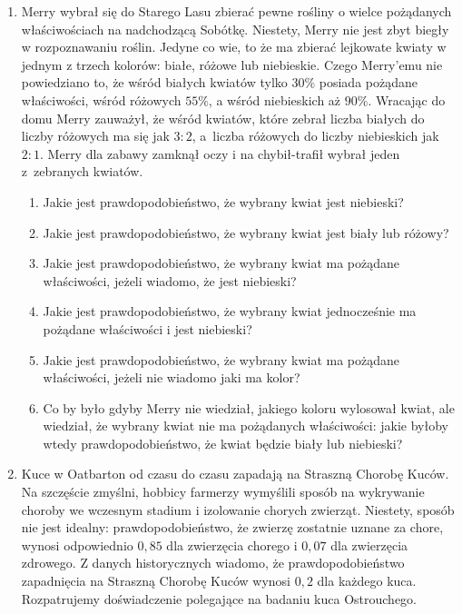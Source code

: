 \documentclass{mwart}
\begin{document}
\begin{enumerate}
\item Merry wybrał się do Starego Lasu zbierać pewne rośliny o wielce pożądanych właściwościach na nadchodzącą Sobótkę.
Niestety, Merry nie jest zbyt biegły w rozpoznawaniu roślin.
Jedyne co wie, to że ma zbierać lejkowate kwiaty w jednym z trzech kolorów: białe, różowe lub niebieskie.
Czego Merry'emu nie powiedziano to, że wśród białych kwiatów tylko $30\%$ posiada pożądane właściwości, wśród różowych $55\%$, a wśród niebieskich
aż $90\%$.
Wracając do domu Merry zauważył, że wśród kwiatów, które zebrał liczba białych do liczby różowych ma się jak $3:2$, a~liczba różowych do
liczby niebieskich jak $2:1$. Merry dla zabawy zamknął oczy i na chybił-trafił wybrał jeden z~zebranych kwiatów.
 
\begin{enumerate}
	\item Jakie jest prawdopodobieństwo, że wybrany kwiat jest niebieski?
	\item Jakie jest prawdopodobieństwo, że wybrany kwiat jest biały lub różowy?
	\item Jakie jest prawdopodobieństwo, że wybrany kwiat ma pożądane właściwości, jeżeli wiadomo, że jest niebieski?
	\item Jakie jest prawdopodobieństwo, że wybrany kwiat jednocześnie ma pożądane właściwości i jest niebieski?
	\item Jakie jest prawdopodobieństwo, że wybrany kwiat ma pożądane właściwości, jeżeli nie wiadomo jaki ma kolor?
	\item Co by było gdyby Merry nie wiedział, jakiego koloru wylosował kwiat, ale wiedział, że wybrany kwiat nie ma pożądanych
		właściwości: jakie byłoby wtedy prawdopodobieństwo, że kwiat będzie biały lub niebieski?
\end{enumerate}
\clearpage
\item Kuce w Oatbarton od czasu do czasu zapadają na Straszną Chorobę Kuców.
Na szczęście zmyślni, hobbicy farmerzy wymyślili sposób na wykrywanie choroby we wczesnym stadium i izolowanie chorych zwierząt.
Niestety, sposób nie jest idealny: prawdopodobieństwo, że zwierzę zostatnie uznane za chore, wynosi odpowiednio $0,85$ dla zwierzęcia chorego i $0,07$ dla zwierzęcia zdrowego.
Z danych historycznych wiadomo, że prawdopodobieństwo zapadnięcia na Straszną Chorobę Kuców wynosi $0,2$ dla każdego kuca.
Rozpatrujemy doświadczenie polegające na badaniu kuca Ostrouchego.


\end{enumerate}
\end{document}
